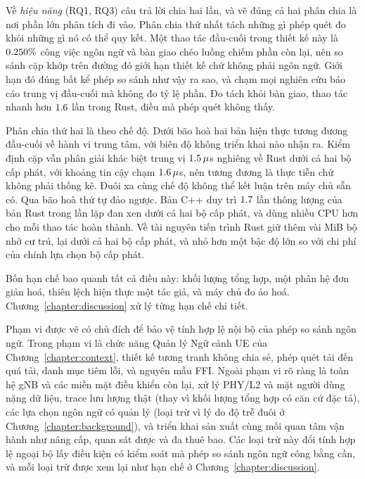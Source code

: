 Về \emph{hiệu năng} (RQ1, RQ3) câu trả lời chia hai lần, và vẽ đúng cả hai phân chia là nơi
phần lớn phân tích đi vào. Phân chia thứ nhất tách những gì phép quét đo khỏi những gì nó có
thể quy kết. Một thao tác đầu-cuối trong thiết kế này là $0.250\%$ công việc
ngôn ngữ và bàn giao chéo luồng chiếm phần còn lại, nên so sánh cặp khớp trên đường đó giới
hạn thiết kế chứ không phải ngôn ngữ. Giới hạn đó đúng bất kể phép so sánh như vậy ra sao, và
chạm mọi nghiên cứu báo cáo trung vị đầu-cuối mà không đo tỷ lệ phần. Đo tách khỏi bàn giao,
thao tác nhanh hơn $1.6$ lần trong Rust, điều mà phép quét không thấy.

Phân chia thứ hai là theo chế độ. Dưới bão hoà hai bản hiện thực tương đương đầu-cuối về hành
vi trung tâm, với biên độ không triển khai nào nhận ra. Kiểm định cặp vẫn phân giải khác biệt
trung vị $1.5\,\mu$s nghiêng về Rust dưới cả hai bộ cấp phát, với khoảng tin cậy
chạm $1.6\,\mu$s, nên tương đương là thực tiễn chứ không phải thống kê. Đuôi xa
cùng chế độ không thể kết luận trên máy chủ sẵn có. Qua bão hoà thứ tự đảo ngược. Bản C++ duy
trì $1.7$ lần thông lượng của bản Rust trong \OverloadThrAgree{} lần lặp đan xen
dưới cả hai bộ cấp phát, và dùng nhiều CPU hơn cho mỗi thao tác hoàn thành. Về tài nguyên tiến
trình Rust giữ thêm vài MiB bộ nhớ cư trú, lại dưới cả hai bộ cấp phát, và nhỏ hơn một bậc
độ lớn so với chi phí của chính lựa chọn bộ cấp phát.

Bốn hạn chế bao quanh tất cả điều này: khối lượng tổng hợp, một phân hệ đơn giản hoá, thiên
lệch hiện thực một tác giả, và máy chủ đo ảo hoá. Chương~\ref{chapter:discussion} xử lý từng
hạn chế chi tiết.

Phạm vi được vẽ có chủ đích để bảo vệ tính hợp lệ nội bộ của phép so sánh ngôn ngữ. Trong
phạm vi là chức năng Quản lý Ngữ cảnh UE của Chương~\ref{chapter:context}, thiết kế tương
tranh không chia sẻ, phép quét tải đến quá tải, danh mục tiêm lỗi, và nguyên mẫu FFI. Ngoài
phạm vi rõ ràng là toàn hệ gNB và các miền mặt điều khiển còn lại, xử lý PHY/L2 và mặt người
dùng nặng dữ liệu, trace lưu lượng thật (thay vì khối lượng tổng hợp có căn cứ đặc tả), các
lựa chọn ngôn ngữ có quản lý (loại trừ vì lý do độ trễ đuôi ở Chương~\ref{chapter:background}),
và triển khai sản xuất cùng mối quan tâm vận hành như nâng cấp, quan sát được và đa thuê bao.
Các loại trừ này đổi tính hợp lệ ngoại bộ lấy điều kiện có kiểm soát mà phép so sánh ngôn
ngữ công bằng cần, và mỗi loại trừ được xem lại như hạn chế ở
Chương~\ref{chapter:discussion}.

